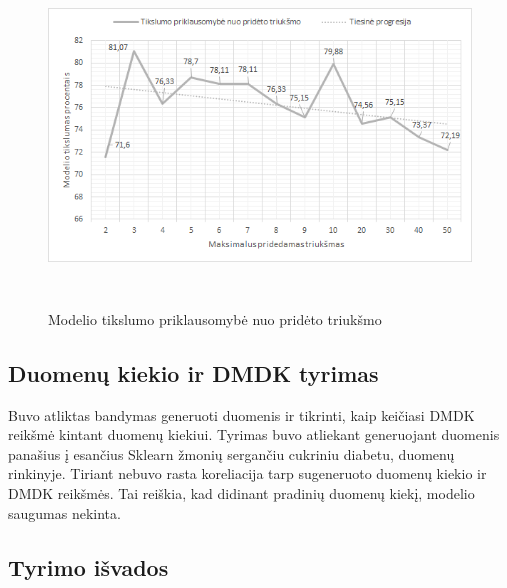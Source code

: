 \documentclass{VUMIFInfBakalaurinis}
\begin{document}
\begin{figure}[h]
  \centering
  \includegraphics[width=13cm,height=9cm,keepaspectratio]{img/tr_tyr_acc.png}
  \caption{Modelio tikslumo priklausomybė nuo pridėto triukšmo}
  \label{fig:Modelio tikslumo priklausomybė nuo pridėto triukšmo}
\end{figure}

\subsection{Duomenų kiekio ir DMDK tyrimas}
\par Buvo atliktas bandymas generuoti duomenis ir tikrinti, kaip keičiasi DMDK reikšmė kintant duomenų kiekiui. Tyrimas buvo atliekant generuojant duomenis panašius į esančius Sklearn žmonių sergančiu cukriniu diabetu, duomenų rinkinyje. Tiriant nebuvo rasta koreliacija tarp sugeneruoto duomenų kiekio ir DMDK reikšmės. Tai reiškia, kad didinant pradinių duomenų kiekį, modelio saugumas nekinta.

\subsection{Tyrimo išvados}
\end{document}
